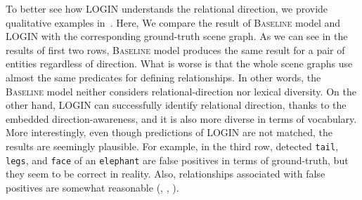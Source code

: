         To better see how LOGIN understands the relational direction, we provide qualitative examples in~.
        Here, We compare the result of \textsc{Baseline} model and \textsc{LOGIN} with the corresponding ground-truth scene graph.
        As we can see in the results of first two rows, \textsc{Baseline} model produces the same result for a pair of entities regardless of direction. What is worse is that the whole scene graphs use almost the same predicates for defining relationships. In other words, the \textsc{Baseline} model neither considers relational-direction nor lexical diversity.
        On the other hand, LOGIN can successfully identify relational direction, thanks to the embedded direction-awareness, and it is also more diverse in terms of vocabulary.
        More interestingly, even though predictions of LOGIN are not matched, the results are seemingly plausible. For example, in the third row, detected \texttt{tail}, \texttt{legs}, and \texttt{face} of an \texttt{elephant} are false positives in terms of ground-truth, but they seem to be correct in reality. Also, relationships associated with false positives are somewhat reasonable (\eg, , ).
        